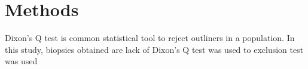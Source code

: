 \chapter{Methods}

Dixon's Q test is common statistical tool to reject outliners in a population. In this study, biopsies obtained are lack of  Dixon's Q test was used to   exclusion test was used 